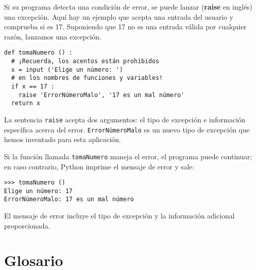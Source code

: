 Si su programa detecta una condición de error, se puede lanzar 
({\bf raise} en inglés) una excepción. Aquí hay un ejemplo que acepta una entrada
del usuario y comprueba si es 17. Suponiendo que 17 no es una entrada válida
por cualquier razón, lanzamos una excepción.

\begin{verbatim}
def tomaNumero () :                 
  # ¡Recuerda, los acentos están prohibidos
  x = input ('Elige un número: ')   
  # en los nombres de funciones y variables!
  if x == 17 :
    raise 'ErrorNúmeroMalo', '17 es un mal número'
  return x
\end{verbatim}
%
La sentencia \texttt{raise} acepta dos argumentos: el tipo de excepción
e información específica acerca del error. \texttt{ErrorNúmeroMalo}
es un nuevo tipo de excepción que hemos inventado para esta aplicación.

Si la función llamada \texttt{tomaNumero} maneja el error, el programa
puede continuar; en caso contrario, Python imprime el mensaje de error
y sale:

\beforeverb
\begin{verbatim}
>>> tomaNumero ()
Elige un número: 17
ErrorNúmeroMalo: 17 es un mal número
\end{verbatim}
\afterverb
%
El mensaje de error incluye el tipo de excepción y la información
adicional proporcionada.



\section{Glosario}


